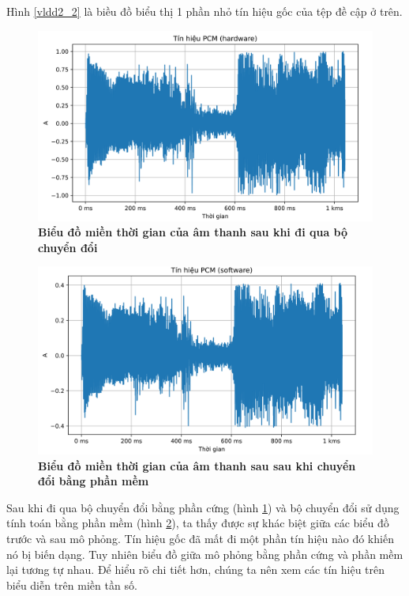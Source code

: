Hình \ref{vldd2_2} là biều đồ biểu thị 1 phần nhỏ tín hiệu gốc của tệp đề cập ở trên. 
\begin{figure}[H]
    \centering
    \includegraphics[width=14cm]{Images/Chuong4/tb/wav/vldd2_0.png}
    \caption[Biểu đồ miền thời gian của âm thanh sau khi đi qua bộ chuyển đổi]{\bfseries \fontsize{12pt}{0pt}\selectfont  Biểu đồ miền thời gian của âm thanh sau khi đi qua bộ chuyển đổi }
    \label{vldd2_0}
\end{figure}

\begin{figure}[H]
    \centering
    \includegraphics[width=14cm]{Images/Chuong4/tb/wav/vldd2_1.png}
    \caption[Biểu đồ miền thời gian của âm thanh sau sau khi chuyển đổi bằng phần mềm]{\bfseries \fontsize{12pt}{0pt}\selectfont  Biểu đồ miền thời gian của âm thanh sau sau khi chuyển đổi bằng phần mềm}
    \label{vldd2_1}
\end{figure}
Sau khi đi qua bộ chuyển đổi bằng phần cứng (hình \ref{vldd2_0}) và bộ chuyển đổi sử dụng tính toán bằng phần mềm (hình \ref{vldd2_1}), ta thấy được sự khác biệt giữa các biểu đồ trước và sau mô phỏng. Tín hiệu gốc đã mất đi một phần tín hiệu nào đó khiến nó bị biến dạng. Tuy nhiên biểu đồ giữa mô phỏng bằng phần cứng và phần mềm lại tương tự nhau. Để hiểu rõ chi tiết hơn, chúng ta nên xem các tín hiệu trên biểu diễn trên miền tần số.

